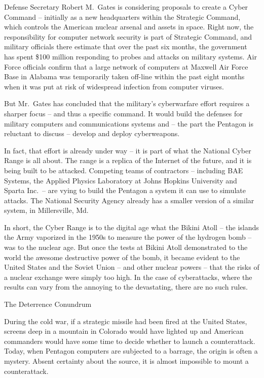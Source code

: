 \documentclass[12pt,a4paper,onecolumn]{article}
\begin{document}
Defense Secretary Robert M.~Gates is considering proposals to create a Cyber Command -- initially as
a new headquarters within the Strategic Command, which controls the American nuclear arsenal and
assets in space. Right now, the responsibility for computer network security is part of Strategic
Command, and military officials there estimate that over the past six months, the government has
spent \$100 million responding to probes and attacks on military systems. Air Force officials
confirm that a large network of computers at Maxwell Air Force Base in Alabama was temporarily taken
off-line within the past eight months when it was put at risk of widespread infection from computer
viruses.

But Mr.~Gates has concluded that the military's cyberwarfare effort requires a sharper focus -- and
thus a specific command. It would build the defenses for military computers and communications
systems and -- the part the Pentagon is reluctant to discuss -- develop and deploy cyberweapons.

In fact, that effort is already under way -- it is part of what the National Cyber Range is all
about. The range is a replica of the Internet of the future, and it is being built to be attacked.
Competing teams of contractors -- including BAE Systems, the Applied Physics Laboratory at Johns
Hopkins University and Sparta Inc.~-- are vying to build the Pentagon a system it can use to
simulate attacks. The National Security Agency already has a smaller version of a similar system, in
Millersville, Md.

In short, the Cyber Range is to the digital age what the Bikini Atoll -- the islands the Army
vaporized in the 1950s to measure the power of the hydrogen bomb -- was to the nuclear age. But once
the tests at Bikini Atoll demonstrated to the world the awesome destructive power of the bomb, it
became evident to the United States and the Soviet Union -- and other nuclear powers -- that the
risks of a nuclear exchange were simply too high. In the case of cyberattacks, where the results can
vary from the annoying to the devastating, there are no such rules.

The Deterrence Conundrum

During the cold war, if a strategic missile had been fired at the United States, screens deep in a
mountain in Colorado would have lighted up and American commanders would have some time to decide
whether to launch a counterattack. Today, when Pentagon computers are subjected to a barrage, the
origin is often a mystery. Absent certainty about the source, it is almost impossible to mount a
counterattack.
\end{document}
